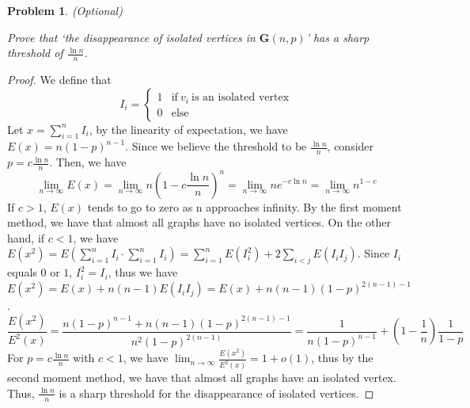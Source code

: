 \documentclass[12pt]{article}
\newtheorem{hw}{Problem}
\begin{document}
\begin{hw} (Optional)

Prove that `the disappearance of isolated vertices in $\mathbf{G}(n,p)$' has a sharp threshold of $\frac{\ln n}{n}$.
\end{hw}
\begin{proof}
	We define that 
	\begin{displaymath}
		I_i = \left\{
			\begin{array}{ll}
				1 & \textrm{if}\ v_i\ \textrm{is an isolated vertex} \\
				0 & \textrm{else}
			\end{array}
			\right.
	\end{displaymath}
	Let $x = \sum_{i = 1}^{n}I_i$, by the linearity of expectation, we have $E(x) = n(1-p)^{n-1}$. Since we believe the threshold to be $\frac{\ln n}{n}$, consider $p = c\frac{\ln n}{n}$. Then, we have $$\lim_{n \rightarrow \infty}E(x) = \lim_{n \rightarrow \infty}n(1 - c\frac{\ln n}{n})^{n} = \lim_{n \rightarrow \infty}ne^{-c \ln n} = \lim_{n \rightarrow \infty}n^{1-c}$$ If $c > 1$, $E(x)$ tends to go to zero as n approaches infinity. By the first moment method, we have that almost all graphs have no isolated vertices. On the other hand, if $c < 1$, we have $E(x^2) = E(\sum_{i = 1}^{n}I_i \cdot \sum_{i = 1}^{n}I_i) = \sum_{i=1}^{n}E(I_{i}^{2}) + 2\sum_{i < j}E(I_{i}I_{j})$. Since $I_{i}$ equals $0$ or $1$, $I_{i}^{2} = I_{i}$, thus we have $$E(x^2) = E(x) + n(n-1)E(I_{i}I_{j}) = E(x) + n(n-1)(1-p)^{2(n-1)-1}$$.
	$$ \frac{E(x^2)}{E^{2}(x)} = \frac{n(1-p)^{n-1} + n(n-1)(1-p)^{2(n-1)-1}}{n^{2}(1-p)^{2(n-1)}} = \frac{1}{n(1-p)^{n-1}} + \left(1 - \frac{1}{n}\right)\frac{1}{1-p}$$
	For $p = c\frac{\ln n}{n}$ with $c < 1$, we have $\lim_{n \rightarrow \infty}\frac{E(x^2)}{E^{2}(x)} = 1 + o(1)$, thus by the second moment method, we have that almost all graphs have an isolated vertex. Thus, $\frac{\ln n}{n}$ is a sharp threshold
	for the disappearance of isolated vertices.
\end{proof}
\end{document}
